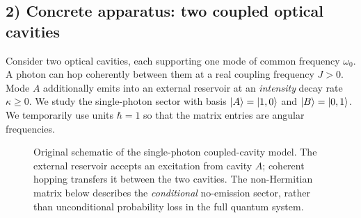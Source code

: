 \subsection*{2) Concrete apparatus: two coupled optical cavities}
Consider two optical cavities, each supporting one mode of common
frequency $\omega_0$. A photon can hop coherently between them at a
real coupling frequency $J>0$. Mode $A$ additionally emits into
an external reservoir at an \emph{intensity} decay rate
$\kappa\geq0$. We study the single-photon sector with basis
$\left|A\right\rangle=\left|1,0\right\rangle$ and $\left|B\right\rangle=\left|0,1\right\rangle$.
We temporarily use units $\hbar=1$ so that the matrix entries
are angular frequencies.

\begin{figure}[tbp]
\centering
{}
\caption{Original schematic of the single-photon coupled-cavity
model. The external reservoir accepts an excitation from cavity
$A$; coherent hopping transfers it between the two cavities.
The non-Hermitian matrix below describes the \emph{conditional}
no-emission sector, rather than unconditional probability loss
in the full quantum system.}
\label{fig:nh-physical-system}
\end{figure}

